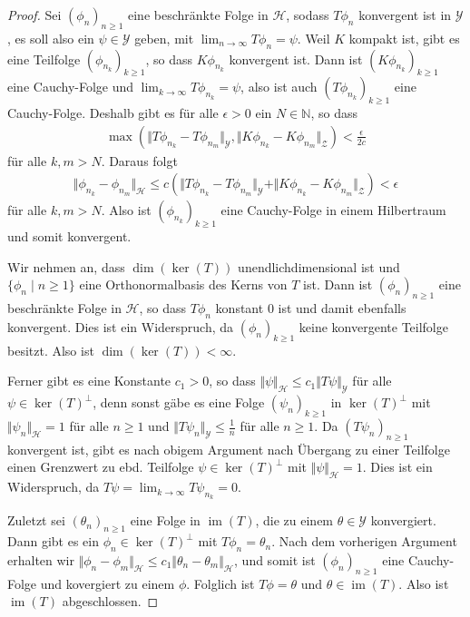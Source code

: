 \documentclass[11pt, hidelinks]{article}
\newcommand{\h}{\mathcal{H}}
\newcommand{\im}{\operatorname{im}}
\newcommand{\on}{{n \geq 1}}
\numberwithin{conj}{section}
\begin{document}
\begin{proof}
    Sei $(\phi_n)_{n \geq 1}$ eine beschränkte Folge in $\h$, sodass $T \phi_n$ konvergent ist in $\mathcal{Y}$, es soll also ein $\psi \in \mathcal{Y}$ geben, mit $\lim_{n\to\infty} T\phi_n = \psi$. Weil $K$ kompakt ist, gibt es eine Teilfolge $(\phi_{n_k})_{k \geq 1}$, so dass $K \phi_{n_k}$ konvergent ist. Dann ist $(K\phi_{n_k})_{k \geq 1}$ eine Cauchy-Folge und $\lim_{k\to\infty} T\phi_{n_k} = \psi$, also ist auch $(T\phi_{n_k})_{k \geq 1}$ eine Cauchy-Folge. Deshalb gibt es für alle $\epsilon > 0$ ein $N\in \mathbb{N}$, so dass
    \begin{align}
        \max(\Vert T\phi_{n_k}-T\phi_{n_m} \Vert_{\mathcal{Y}}, \Vert K\phi_{n_k}-K\phi_{n_m} \Vert_{\mathcal{Z}}) < \frac{\epsilon}{2c}
    \end{align}
    für alle $k,m > N$. Daraus folgt
    \begin{align}
        \Vert \phi_{n_k} - \phi_{n_m} \Vert_\h \leq c (\Vert T\phi_{n_k}-T\phi_{n_m} \Vert_{\mathcal{Y}} +  \Vert K\phi_{n_k}-K\phi_{n_m} \Vert_{\mathcal{Z}}) < \epsilon
    \end{align}
    für alle $k,m > N$. Also ist $(\phi_{n_k})_{k \geq 1}$ eine Cauchy-Folge in einem Hilbertraum und somit konvergent.

    Wir nehmen an, dass $\dim(\ker(T))$ unendlichdimensional ist und $\{\phi_n \;\vert\; n \geq 1\}$ eine Orthonormalbasis des Kerns von $T$ ist. Dann ist $(\phi_n)_{n \geq 1}$ eine beschränkte Folge in $\h$, so dass $T \phi_n$ konstant $0$ ist und damit ebenfalls konvergent. Dies ist ein Widerspruch, da $(\phi_n)_{k \geq 1}$ keine konvergente Teilfolge besitzt. Also ist $\dim(\ker(T)) < \infty$.

    Ferner gibt es eine Konstante $c_1 > 0$, so dass $\Vert \psi \Vert_\h \leq c_1 \Vert T\psi \Vert_{\mathcal{Y}}$ für alle $\psi \in \ker(T)^\perp$, denn sonst gäbe es eine Folge $(\psi_n)_{k \geq 1}$ in $\ker(T)^\perp$ mit $\Vert \psi_n \Vert_\h = 1$ für alle $n \geq 1$ und $\Vert T\psi_n \Vert_{\mathcal{Y}} \leq \frac{1}{n}$ für alle $n \geq 1$. Da $(T\psi_n)_\on$ konvergent ist, gibt es nach obigem Argument nach Übergang zu einer Teilfolge einen Grenzwert zu ebd. Teilfolge $\psi \in \ker(T)^\perp$ mit $\Vert \psi \Vert_\h = 1$. Dies ist ein Widerspruch, da $T \psi = \lim_{k\to\infty} T \psi_{n_k} = 0$.

    Zuletzt sei $(\theta_n)_{n \geq 1}$ eine Folge in $\im(T)$, die zu einem $\theta \in \mathcal{Y}$ konvergiert. Dann gibt es ein $\phi_n \in \ker(T)^\perp$ mit $T\phi_n = \theta_n$. Nach dem vorherigen Argument erhalten wir $\Vert\phi_n-\phi_m\Vert_\h \leq c_1 \Vert \theta_n - \theta_m \Vert_\h$, und somit ist $(\phi_n)_{n\geq 1}$ eine Cauchy-Folge und kovergiert zu einem $\phi$. Folglich ist $T\phi = \theta$ und $\theta \in \im(T)$. Also ist $\im(T)$ abgeschlossen.
\end{proof}
\end{document}
